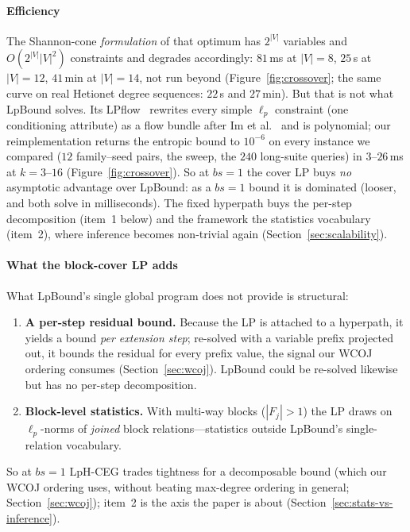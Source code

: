 \documentclass[conference]{IEEEtran}
\newcommand{\block}{F}
\begin{document}
\paragraph{Efficiency}
The Shannon-cone \emph{formulation} of that optimum has $2^{|V|}$
variables and $O(2^{|V|}|V|^2)$ constraints and degrades accordingly:
$81$\,ms at $|V|{=}8$, $25$\,s at $|V|{=}12$, $41$\,min at $|V|{=}14$,
not run beyond (Figure~\ref{fig:crossover}; the same curve on real Hetionet degree sequences: $22$\,s and $27$\,min). But that is not what
LpBound solves. Its LPflow~\cite[Thm.~4.5]{zhang2025lpbound} rewrites
every simple $\ell_p$ constraint (one conditioning attribute) as a flow
bundle after Im et al.~\cite{im2025simple} and is polynomial; our
reimplementation returns the entropic bound to $10^{-6}$ on every
instance we compared ($12$ family--seed pairs, the sweep, the $240$ long-suite queries) in $3$--$26$\,ms at $k{=}3$--$16$
(Figure~\ref{fig:crossover}). So at $bs{=}1$ the cover LP buys
\emph{no} asymptotic advantage over LpBound: as a $bs{=}1$ bound it is
dominated (looser, and both solve in milliseconds). The fixed hyperpath buys the per-step decomposition
(item~1 below) and the framework the statistics vocabulary (item~2), where
inference becomes non-trivial again (Section~\ref{sec:scalability}).

\paragraph{What the block-cover LP adds}
What LpBound's single global program does not provide is structural:
\begin{enumerate}
\item \textbf{A per-step residual bound.} Because the LP is attached to
  a hyperpath, it yields a bound \emph{per extension step}; re-solved with a
  variable prefix projected out, it bounds the residual for every prefix
  value, the signal our WCOJ ordering consumes (Section~\ref{sec:wcoj}).
  LpBound could be re-solved likewise but has no per-step decomposition.
\item \textbf{Block-level statistics.} With multi-way blocks
  ($|\block_j| > 1$) the LP draws on $\ell_p$-norms of \emph{joined}
  block relations---statistics outside LpBound's single-relation
  vocabulary.
\end{enumerate}
So at $bs{=}1$ LpH-CEG trades tightness for a decomposable bound (which our WCOJ ordering uses, without beating max-degree ordering in general; Section~\ref{sec:wcoj}); item~2 is the axis the paper is about
(Section~\ref{sec:stats-vs-inference}).
\end{document}
